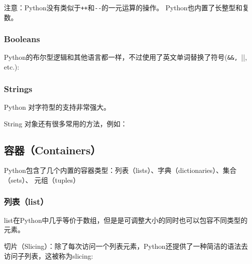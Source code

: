 \documentclass[10pt,a4paper]{article}
\begin{document}
注意：Python没有类似于\lstinline|++|和\lstinline|--|的一元运算的操作。 Python也内置了长整型和复数。


%

\subsubsection{Booleans}
Python的布尔型逻辑和其他语言都一样，不过使用了英文单词替换了符号(\lstinline|&&, |||, etc.):



%

\subsubsection{Strings}
Python 对字符型的支持非常强大。




String 对象还有很多常用的方法，例如：




\subsection{容器（Containers）}

Python包含了几个内置的容器类型：列表（lists）、字典（dictionaries）、集合（sets）、 元组（tuples）

\subsubsection{列表（list）}


list在Python中几乎等价于数组，但是是可调整大小的同时也可以包容不同类型的元素。





切片（Slicing）：除了每次访问一个列表元素，Python还提供了一种简洁的语法去访问子列表，这被称为slicing:
\end{document}
